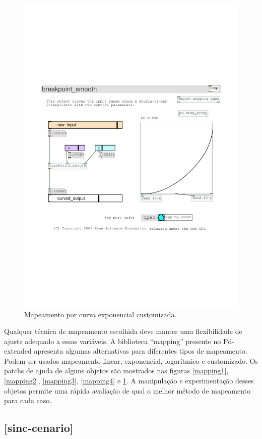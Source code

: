 \documentclass{ppgmus}
\begin{document}
\begin{figure}
\includegraphics[scale=.6]{mapping5}
\caption{Mapeamento por curva exponencial customizada.}
\label{mapping5}
\end{figure}


Qualquer técnica de mapeamento escolhida deve manter uma flexibilidade
de ajuste adequado a essas variáveis. A biblioteca ``mapping'' presente no
Pd-extended apresenta algumas alternativas para diferentes tipos de mapeamento.
Podem ser usados mapeamento linear, exponencial, logarítmico e customizado.
Os patchs de ajuda de alguns objetos são mostrados nas figuras \ref{mapping1}, \ref{mapping2},
\ref{mapping3}, \ref{mapping4} e \ref{mapping5}.
A manipulação e experimentação desses objetos permite uma rápida avaliação de qual o melhor
método de mapeamento para cada caso.


\subsection{[sinc-cenario]}
\end{document}
